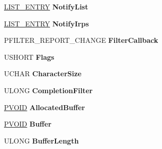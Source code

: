 \begin{DoxyCompactItemize}
\mbox{\label{struct___n_o_t_i_f_y___c_h_a_n_g_e_ad297f75fc19d1104c598a647c2555717}} 
\hyperlink{struct___l_i_s_t___e_n_t_r_y}{L\+I\+S\+T\+\_\+\+E\+N\+T\+RY} {\bfseries Notify\+List}
\item 
\mbox{\label{struct___n_o_t_i_f_y___c_h_a_n_g_e_a5d7bf6420c20dbe42458cda89f0e1d19}} 
\hyperlink{struct___l_i_s_t___e_n_t_r_y}{L\+I\+S\+T\+\_\+\+E\+N\+T\+RY} {\bfseries Notify\+Irps}
\item 
\mbox{\label{struct___n_o_t_i_f_y___c_h_a_n_g_e_aedd8211d6c64fcef4b6103b892f5df66}} 
P\+F\+I\+L\+T\+E\+R\+\_\+\+R\+E\+P\+O\+R\+T\+\_\+\+C\+H\+A\+N\+GE {\bfseries Filter\+Callback}
\item 
\mbox{\label{struct___n_o_t_i_f_y___c_h_a_n_g_e_a42ac7c12b0cf359d3250546127afd715}} 
U\+S\+H\+O\+RT {\bfseries Flags}
\item 
\mbox{\label{struct___n_o_t_i_f_y___c_h_a_n_g_e_ad152f9e33ecb637fad88b78e301d2a84}} 
U\+C\+H\+AR {\bfseries Character\+Size}
\item 
\mbox{\label{struct___n_o_t_i_f_y___c_h_a_n_g_e_a5d98624c3a14027fdf7df13234baf95b}} 
U\+L\+O\+NG {\bfseries Completion\+Filter}
\item 
\mbox{\label{struct___n_o_t_i_f_y___c_h_a_n_g_e_a406f62a8c12db2840e600ab3e372fb5f}} 
\hyperlink{interfacevoid}{P\+V\+O\+ID} {\bfseries Allocated\+Buffer}
\item 
\mbox{\label{struct___n_o_t_i_f_y___c_h_a_n_g_e_a38148d0fb51bddb930095cc9a4b76346}} 
\hyperlink{interfacevoid}{P\+V\+O\+ID} {\bfseries Buffer}
\item 
\mbox{\label{struct___n_o_t_i_f_y___c_h_a_n_g_e_a18b1b50fe8ac14ed82229cbcd47b865b}} 
U\+L\+O\+NG {\bfseries Buffer\+Length}
\item 
\mbox{\label{struct___n_o_t_i_f_y___c_h_a_n_g_e_adb62c5ca3545a49d352668267cd3ada1}} 

\end{DoxyCompactItemize}
